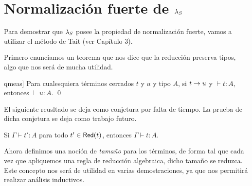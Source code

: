 \chapter{Normalización fuerte de \texorpdfstring{\( \lambda_S \)}{Lambda S}}\label{Chapter5}

Para demostrar que \( \lambda_S \) posee la propiedad de normalización fuerte, vamos a utilizar el método de Tait (ver Capítulo 3).

Primero enunciamos un teorema que nos dice que la reducción preserva tipos, algo que nos será de mucha utilidad.

\newcommand\citedsr{\cite[Teo. 4.4]{qmeas}}

\begin{theorem}[Subject reduction, \citedsr]\label{thm:subject-reduction}
  Para cualesquiera términos cerrados \( t \) y \( u \) y tipo \( A \), si \( t \rightarrow u \) y \( \vdash t : A \), entonces \( \vdash u : A \).
  \qed
\end{theorem}

El siguiente reusltado se deja como conjetura por falta de tiempo. La prueba de dicha conjetura se deja como trabajo futuro.

\begin{conjecture}\label{cnj:subject-expansion}
  Si \( \Gamma \vdash t' : A \) para todo \( t' \in \mathsf{Red} (t) \), entonces \( \Gamma \vdash t : A \).
\end{conjecture}

Ahora definimos una noción de \textit{tamaño} para los términos, de forma tal que cada vez que apliquemos una regla de reducción algebraica, dicho tamaño se reduzca. Este concepto nos será de utilidad en varias demostraciones, ya que nos permitirá realizar análisis inductivos.

